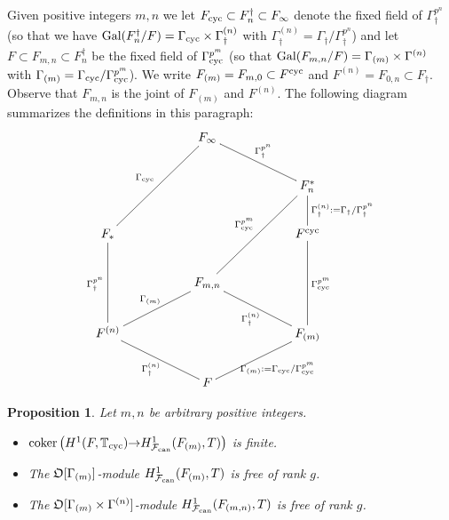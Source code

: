 \documentclass[12pt]{amsart}
\numberwithin{equation}{section}
\newtheorem{prop}[thm]{Proposition}
\begin{document}
Given positive integers $m,n$ we let $F_{\textup{cyc}}\subset F^\dagger_n\subset F_\infty$ denote the fixed field of $\Gamma_\dagger^{p^n}$ (so that we have $\textup{Gal}(F_n^\dagger/F)=\Gamma_{\textup{cyc}}\times \Gamma_\dagger^{(n)}$ with $ \Gamma_\dagger^{(n)}=\Gamma_\dagger/\Gamma_\dagger^{p^n}$) and let $F\subset F_{m,n} \subset F^\dagger_n$ be the fixed field of $\Gamma_{\textup{cyc}}^{p^m}$ (so that  $\textup{Gal}(F_{m,n}/F)=\Gamma_{(m)}\times \Gamma^{(n)}$ with $\Gamma_{(m)}=\Gamma_{\textup{cyc}}/\Gamma_{\textup{cyc}}^{p^m}$). We write $F_{(m)}=F_{m,0} \subset F^{\textup{cyc}}$ and $F^{(n)}=F_{0,n}\subset F_\dagger$. Observe that $F_{m,n}$ is the joint of $F_{(m)}$ and $F^{(n)}$. The following diagram summarizes the definitions in this paragraph:
$$\xymatrix{&&F_\infty\ar@{-}[rrd]^{\Gamma_\dagger^{p^n}}\ar@{-}[lldd]_{\Gamma_{\textup{cyc}}}&&\\
&&&&F^*_n\ar@{-}[d]^{\Gamma_\dagger^{(n)}:=\Gamma_\dagger/\Gamma_\dagger^{p^n}}\ar@{-}[lldd]_{\Gamma_{\textup{cyc}}^{p^m}}\\
F_*\ar@{-}[dd]_{\Gamma_\dagger^{p^n}}&&&& F^{\textup{cyc}}\ar@{-}[dd]^{\Gamma_{\textup{cyc}}^{p^m}}\\
&&F_{m,n}\ar@{-}[lld]_{\Gamma_{(m)}}\ar@{-}[rrd]_{\Gamma_\dagger^{(n)}}&&\\
F^{(n)}\ar@{-}[rrd]_{\Gamma_\dagger^{(n)}}&&&&F_{(m)}\ar@{-}[lld]^{\Gamma_{(m)}:=\Gamma_{\textup{cyc}}/\Gamma_{\textup{cyc}}^{p^m}}\\
&&F&&}$$
\begin{prop}
\label{prop:freenessoverfinitelayers}
Let $m,n$ be arbitrary positive integers.
\begin{itemize}
\item[(i)] $\textup{coker}\left(H^1(F,{\mathbb{T}}_{\textup{cyc}}){\rightarrow} H^1_{\mathcal{F}_{\textup{\lowercase{can}}}}(F_{(m)},T)\right)$ is finite.
\item[(ii)] The ${\frak{O}}[\Gamma_{(m)}]$-module $H^1_{\mathcal{F}_{\textup{\lowercase{can}}}}(F_{(m)},T)$ is free of rank $g$.
\item[(iii)]The ${\frak{O}}[\Gamma_{(m)}\times\Gamma^{(n)}]$-module $H^1_{\mathcal{F}_{\textup{\lowercase{can}}}}(F_{(m,n)},T)$ is free of rank $g$.
\end{itemize}
\end{prop}
\end{document}
